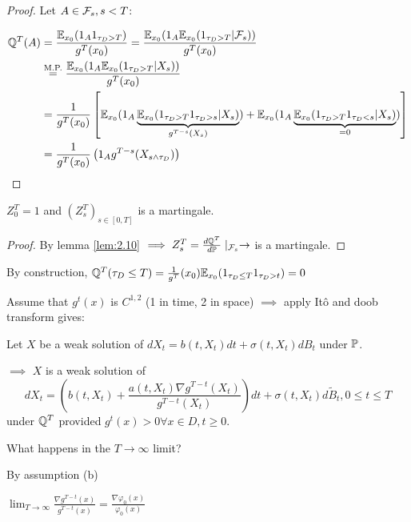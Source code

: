 \begin{proof}
    Let $A\in\mathcal{F}_s,s<T$:

    \begin{align*}
        \mathbb{Q}^T(A)&=\frac{\mathbb{E}_{x_0}(1_A1_{\tau_D>T})}{g^T(x_0)}=\frac{\mathbb{E}_{x_0}(1_A\mathbb{E}_{x_0}(1_{\tau_D>T}|\mathcal{F}_s))}{g^T(x_0)}\\
        &\stackrel{\text{M.P.}}{=}\frac{\mathbb{E}_{x_0}(1_A\mathbb{E}_{x_0}(1_{\tau_D>T}|X_s))}{g^T(x_0)}\\
        &=\frac{1}{g^T(x_0)}\left[\mathbb{E}_{x_0}(1_A\underbrace{\mathbb{E}_{x_0}(1_{\tau_D>T}1_{\tau_D>s}|X_s)}_{g^{T-s}(X_s)})+\mathbb{E}_{x_0}(1_A\underbrace{\mathbb{E}_{x_0}(1_{\tau_D>T}1_{\tau_D<s}|X_s)}_{=0})\right]\\
        &=\frac{1}{g^T(x_0)}\left(1_A g^{T-s}(X_{s\land \tau_D})\right)
    \end{align*}
\end{proof}

\begin{lemma}\label{lem:2.11}
    $Z_0^T=1$ and $(Z_s^T)_{s\in [0,T]}$ is a martingale.
\end{lemma}

\begin{proof}
    By lemma \ref{lem:2.10} $\implies Z_s^T=\frac{d\mathbb{Q}^T}{d\mathbb{P}}\mid_{\mathcal{F}_s}\to$ is a martingale.
\end{proof}

\begin{remark}
    By construction, $\mathbb{Q}^T(\tau_D\leq T)=\frac{1}{g^T}(x_0)\mathbb{E}_{x_0}(1_{\tau_D\leq T}1_{\tau_D>t})=0$
\end{remark}

Assume that $g^t(x)$ is $C^{1,2}$ (1 in time, 2 in space) $\implies$ apply Itô and 
doob transform gives:

\begin{proposition}\label{prop:2.12}
    Let $X$ be a weak solution of $dX_t=b(t,X_t)dt+\sigma(t,X_t)dB_t$ under $\mathbb{P}$.

    $\implies$ $X$ is a weak solution of 
    \[dX_t=\left(b(t,X_t)+\frac{a(t,X_t) \nabla g^{T-t}(X_t)}{g^{T-t}(X_t)}\right)dt +\sigma(t,X_t)d\tilde{B}_t, 0\leq t\leq T\]
    under $\mathbb{Q}^T$ provided $g^t(x)>0\forall x\in D,t\geq 0$.
\end{proposition}

What happens in the $T\to\infty$ limit?

By assumption (b)

$\lim_{T\to\infty}\frac{\nabla g^{T-t}(x)}{g^{T-t}(x)}=\frac{\nabla \varphi_0(x)}{\varphi_0(x)}$


